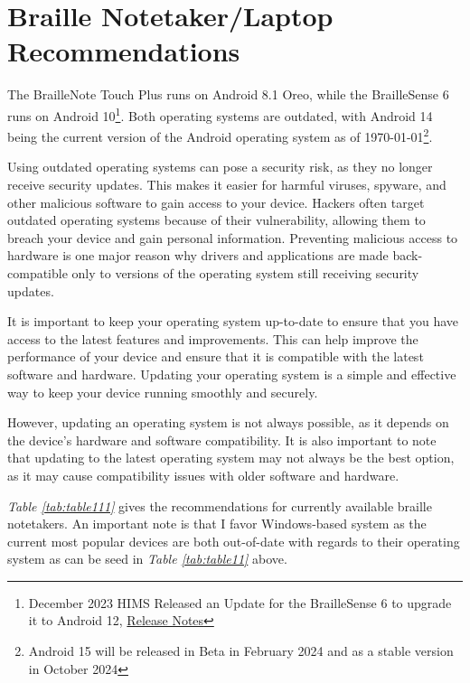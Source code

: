 \hypertarget{braille-notetakers-and-braille-laptop-computers-recommend}{}\section{Braille Notetaker/Laptop Recommendations}\label{braille-notetakers-and-braille-laptop-computers-recommend}
The BrailleNote Touch Plus runs on Android 8.1 Oreo, while the BrailleSense 6 runs on Android 10\footnote{\raggedright December 2023 HIMS Released an Update for the BrailleSense 6 to upgrade it to Android 12, \href{https://hims-inc.com/wp-content/uploads/2023/11/Release-Note-for-BrailleSense-6-V2.0.docx}{Release Notes}}. Both operating systems are outdated, with Android 14 being the current version of the Android operating system as of \today\footnote{\raggedright Android 15 will be released in Beta in February 2024 and as a stable version in October 2024}.

Using outdated operating systems can pose a security risk, as they no longer receive security updates. This makes it easier for harmful viruses, spyware, and other malicious software to gain access to your device. Hackers often target outdated operating systems because of their vulnerability, allowing them to breach your device and gain personal information. Preventing malicious access to hardware is one major reason why drivers and applications are made back-compatible only to versions of the operating system still receiving security updates. 

It is important to keep your operating system up-to-date to ensure that you have access to the latest features and improvements. This can help improve the performance of your device and ensure that it is compatible with the latest software and hardware. Updating your operating system is a simple and effective way to keep your device running smoothly and securely.

However, updating an operating system is not always possible, as it depends on the device’s hardware and software compatibility. It is also important to note that updating to the latest operating system may not always be the best option, as it may cause compatibility issues with older software and hardware.

\textit{Table \ref{tab:table111}} gives the recommendations for currently available braille notetakers. An important note is that I favor Windows-based system as the current most popular devices are both out-of-date with regards to their operating system as can be seed in \textit{Table \ref{tab:table11}} above.

